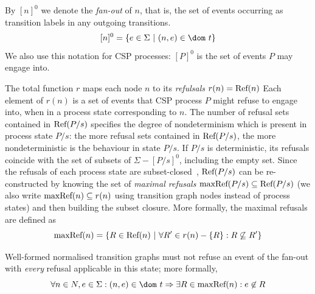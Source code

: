 By $[n]^0$ we denote the \emph{fan-out} of $n$, that is, the set of events occurring as transition labels in any outgoing transitions.
$$
[n]^0 = \{ e\in\Sigma~|~(n,e)\in\dom~t \}
$$
We also use this notation for CSP processes: $[P]^0$ is the set of events $P$ may engage into.




The total function $r$ maps each node $n$ to its \emph{refulsals} $r(n) = \text{Ref}(n)$ Each element of $r(n)$ is a set of events that
CSP process $P$ might refuse to engage into, when in a process state corresponding to $n$.
The number of refusal sets contained in $\text{Ref}(P/s)$ specifies the degree of nondeterminism
which is present in process state $P/s$: the more refusal sets contained in  $\text{Ref}(P/s)$,
the more nondeterministic is the behaviour in state $P/s$. If $P/s$ is deterministic,
its refusals coincide with the set of subsets of $\Sigma - [P/s]^0$, including the
empty set. Since the refusals of each process state are
subset-closed~\cite{Hoare:1985:CSP:3921,Roscoe2010}, $\text{Ref}(P/s)$ can be re-constructed
by knowing the set of \emph{maximal refusals} $\text{maxRef}(P/s)\subseteq\text{Ref}(P/s)$ (we also write $\text{maxRef}(n) \subseteq r(n)$ using transition graph nodes instead of
process states) and then  building the subset closure. More formally, the maximal refusals
are defined as
$$
\text{maxRef}(n) = \{ R \in\text{Ref}(n)~|~\forall R'\in r(n) - \{ R\}: R \not\subseteq R'\}
$$

Well-formed normalised transition graphs must not refuse an event of the fan-out
with {\it every} refusal applicable in this state; more formally,
\begin{equation}
\label{eq:wellformedg}
\forall n\in N, e\in\Sigma: (n,e)\in\dom~t \Rightarrow
\exists R\in \maxrefs(n): e\not\in R
\end{equation}







%

